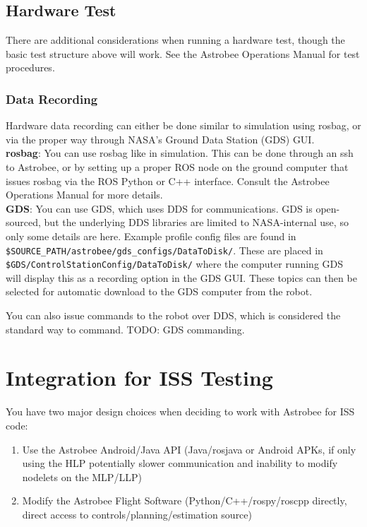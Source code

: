 \documentclass{article}
\begin{document}
\subsection{Hardware Test}

There are additional considerations when running a hardware test, though the basic test structure above will work. See the Astrobee Operations Manual for test procedures.

\subsubsection{Data Recording}

Hardware data recording can either be done similar to simulation using rosbag, or via the proper way through NASA's Ground Data Station (GDS) GUI.
\\

\textbf{rosbag}: You can use rosbag like in simulation. This can be done through an ssh to Astrobee, or by setting up a proper ROS node on the ground computer that issues rosbag via the ROS Python or C++ interface. Consult the Astrobee Operations Manual for more details.
\\

\textbf{GDS}: You can use GDS, which uses DDS for communications. GDS is open-sourced, but the underlying DDS libraries are limited to NASA-internal use, so only some details are here. Example profile config files are found in \texttt{\$SOURCE\_PATH/astrobee/gds\_configs/DataToDisk/}. These are placed in \texttt{\$GDS/ControlStationConfig/DataToDisk/} where the computer running GDS will display this as a recording option in the GDS GUI. These topics can then be selected for automatic download to the GDS computer from the robot.

You can also issue commands to the robot over DDS, which is considered the standard way to command. TODO: GDS commanding.

\section{Integration for ISS Testing}

You have two major design choices when deciding to work with Astrobee for ISS code:

\begin{enumerate}
    \item Use the Astrobee Android/Java API (Java/rosjava or Android APKs, if only using the HLP potentially slower communication and inability to modify nodelets on the MLP/LLP)
    \item Modify the Astrobee Flight Software (Python/C++/rospy/roscpp directly, direct access to controls/planning/estimation source)
\end{enumerate}
\end{document}
